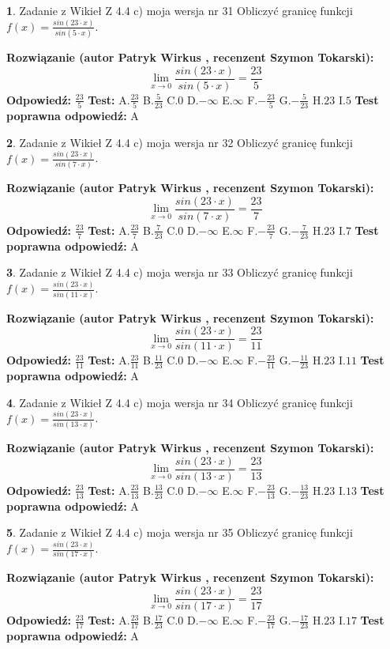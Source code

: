 \documentclass[12pt, a4paper]{article}
\theoremstyle{definition} %
\newtheorem{zad}{}
\newcommand{\zadStart}[1]{\begin{zad}#1\newline}
\newcommand{\zadStop}{\end{zad}}
\newcommand{\rozwStart}[2]{\noindent \textbf{Rozwiązanie (autor #1 , recenzent #2): }\newline}
\newcommand{\rozwStop}{\newline}
\newcommand{\odpStart}{\noindent \textbf{Odpowiedź:}\newline}
\newcommand{\odpStop}{\newline}
\newcommand{\testStart}{\noindent \textbf{Test:}\newline}
\newcommand{\testStop}{\newline}
\newcommand{\kluczStart}{\noindent \textbf{Test poprawna odpowiedź:}\newline}
\newcommand{\kluczStop}{\newline}
\begin{document}
\zadStart{Zadanie z Wikieł Z 4.4 c) moja wersja nr 31}
Obliczyć granicę funkcji $f(x)=\frac{sin(23\cdot x)}{sin(5\cdot x)}$.
\zadStop
\rozwStart{Patryk Wirkus}{Szymon Tokarski}
$$\lim\limits_{x\to 0}\frac{sin(23\cdot x)}{sin(5\cdot x)}=
\frac{23}{5}$$
\rozwStop
\odpStart
$\frac{23}{5}$
\odpStop
\testStart
A.$\frac{23}{5}$
B.$\frac{5}{23}$
C.$0$
D.$-\infty$
E.$\infty$
F.$-\frac{23}{5}$
G.$-\frac{5}{23}$
H.$23$
I.$5$
\testStop
\kluczStart
A
\kluczStop



\zadStart{Zadanie z Wikieł Z 4.4 c) moja wersja nr 32}
Obliczyć granicę funkcji $f(x)=\frac{sin(23\cdot x)}{sin(7\cdot x)}$.
\zadStop
\rozwStart{Patryk Wirkus}{Szymon Tokarski}
$$\lim\limits_{x\to 0}\frac{sin(23\cdot x)}{sin(7\cdot x)}=
\frac{23}{7}$$
\rozwStop
\odpStart
$\frac{23}{7}$
\odpStop
\testStart
A.$\frac{23}{7}$
B.$\frac{7}{23}$
C.$0$
D.$-\infty$
E.$\infty$
F.$-\frac{23}{7}$
G.$-\frac{7}{23}$
H.$23$
I.$7$
\testStop
\kluczStart
A
\kluczStop



\zadStart{Zadanie z Wikieł Z 4.4 c) moja wersja nr 33}
Obliczyć granicę funkcji $f(x)=\frac{sin(23\cdot x)}{sin(11\cdot x)}$.
\zadStop
\rozwStart{Patryk Wirkus}{Szymon Tokarski}
$$\lim\limits_{x\to 0}\frac{sin(23\cdot x)}{sin(11\cdot x)}=
\frac{23}{11}$$
\rozwStop
\odpStart
$\frac{23}{11}$
\odpStop
\testStart
A.$\frac{23}{11}$
B.$\frac{11}{23}$
C.$0$
D.$-\infty$
E.$\infty$
F.$-\frac{23}{11}$
G.$-\frac{11}{23}$
H.$23$
I.$11$
\testStop
\kluczStart
A
\kluczStop



\zadStart{Zadanie z Wikieł Z 4.4 c) moja wersja nr 34}
Obliczyć granicę funkcji $f(x)=\frac{sin(23\cdot x)}{sin(13\cdot x)}$.
\zadStop
\rozwStart{Patryk Wirkus}{Szymon Tokarski}
$$\lim\limits_{x\to 0}\frac{sin(23\cdot x)}{sin(13\cdot x)}=
\frac{23}{13}$$
\rozwStop
\odpStart
$\frac{23}{13}$
\odpStop
\testStart
A.$\frac{23}{13}$
B.$\frac{13}{23}$
C.$0$
D.$-\infty$
E.$\infty$
F.$-\frac{23}{13}$
G.$-\frac{13}{23}$
H.$23$
I.$13$
\testStop
\kluczStart
A
\kluczStop



\zadStart{Zadanie z Wikieł Z 4.4 c) moja wersja nr 35}
Obliczyć granicę funkcji $f(x)=\frac{sin(23\cdot x)}{sin(17\cdot x)}$.
\zadStop
\rozwStart{Patryk Wirkus}{Szymon Tokarski}
$$\lim\limits_{x\to 0}\frac{sin(23\cdot x)}{sin(17\cdot x)}=
\frac{23}{17}$$
\rozwStop
\odpStart
$\frac{23}{17}$
\odpStop
\testStart
A.$\frac{23}{17}$
B.$\frac{17}{23}$
C.$0$
D.$-\infty$
E.$\infty$
F.$-\frac{23}{17}$
G.$-\frac{17}{23}$
H.$23$
I.$17$
\testStop
\kluczStart
A
\kluczStop
\end{document}
